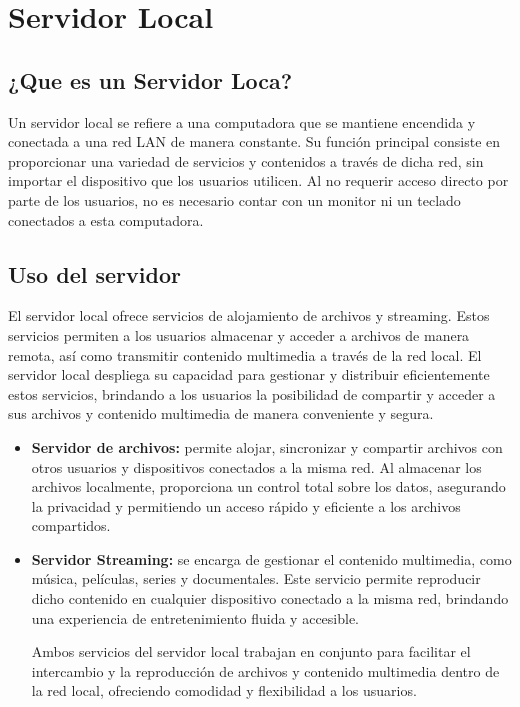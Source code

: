 \chapter{Servidor Local}\label{ch:servidor}

	\section{¿Que es un Servidor Loca?}
	
	Un servidor local se refiere a una computadora que se mantiene encendida y conectada a una red LAN de manera constante. Su función principal consiste en proporcionar una variedad de servicios y contenidos a través de dicha red, sin importar el dispositivo que los usuarios utilicen. Al no requerir acceso directo por parte de los usuarios, no es necesario contar con un monitor ni un teclado conectados a esta computadora.
		
	\section{Uso del servidor}
	
El servidor local ofrece servicios de alojamiento de archivos y streaming. Estos servicios permiten a los usuarios almacenar y acceder a archivos de manera remota, así como transmitir contenido multimedia a través de la red local. El servidor local despliega su capacidad para gestionar y distribuir eficientemente estos servicios, brindando a los usuarios la posibilidad de compartir y acceder a sus archivos y contenido multimedia de manera conveniente y segura.		
		
		\begin{itemize}

\item\textbf{Servidor de archivos:} permite alojar, sincronizar y compartir archivos con otros usuarios y dispositivos conectados a la misma red. Al almacenar los archivos localmente, proporciona un control total sobre los datos, asegurando la privacidad y permitiendo un acceso rápido y eficiente a los archivos compartidos.

\item\textbf{Servidor Streaming:} se encarga de gestionar el contenido multimedia, como música, películas, series y documentales. Este servicio permite reproducir dicho contenido en cualquier dispositivo conectado a la misma red, brindando una experiencia de entretenimiento fluida y accesible.

Ambos servicios del servidor local trabajan en conjunto para facilitar el intercambio y la reproducción de archivos y contenido multimedia dentro de la red local, ofreciendo comodidad y flexibilidad a los usuarios.\par
		
		\end{itemize}
		
